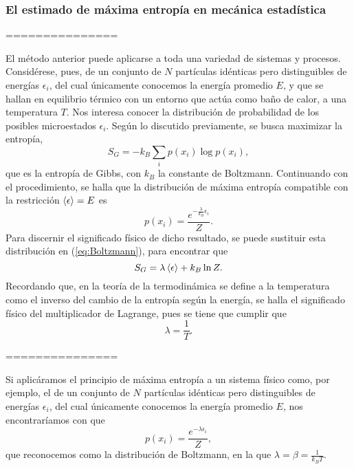 \subsubsection{El estimado de máxima entropía en mecánica estadística}

===============

El método anterior puede aplicarse a toda una variedad de sistemas y procesos. Considérese, pues, de un conjunto de $N$ partículas idénticas pero distinguibles de energías $\epsilon_{i}$, del cual únicamente conocemos la energía promedio $E$, y que se hallan en equilibrio térmico con un entorno que actúa como baño de calor, a una temperatura $T$. Nos interesa conocer la distribución de probabilidad de los posibles microestados $\epsilon_{i}$. Según lo discutido previamente, se busca maximizar la entropía,
\begin{equation}\label{eq:GibbsEntropy}
    S_{G}=-k_{B}\sum_{i}p(x_{i})\log{p(x_{i})},
\end{equation}
que es la entropía de Gibbs, con $k_{B}$ la constante de Boltzmann. Continuando con el procedimiento, se halla que la distribución de máxima entropía compatible con la restricción $\expval{\epsilon}=E$ es
\begin{equation}\label{eq:Boltzmann}
    p(x_{i})=\frac{e^{-\frac{\lambda}{k_{B}}\epsilon_{i}}}{Z}.
\end{equation}
Para discernir el significado físico de dicho resultado, se puede sustituir esta distribución en (\ref{eq:Boltzmann}), para encontrar que
\begin{equation}
    S_{G}=\lambda\expval{\epsilon}+k_{B}\ln{Z}.
\end{equation}
Recordando que, en la teoría de la termodinámica se define a la temperatura como el inverso del cambio de la entropía según la energía, se halla el significado físico del multiplicador de Lagrange, pues se tiene que cumplir que
\begin{equation*}
    \lambda=\frac{1}{T}.
\end{equation*}

===============

Si aplicáramos el principio de máxima entropía a un sistema físico  como, por ejemplo, el de un conjunto de $N$ partículas idénticas pero distinguibles de energías $\epsilon_{i}$, del cual únicamente conocemos la energía promedio $E$, nos encontraríamos con que
\begin{equation}\label{eq:Boltzman}
    p(x_{i})=\frac{e^{-\lambda\epsilon_{i}}}{Z},
\end{equation}
que reconocemos como la distribución de Boltzmann, en la que $\lambda=\beta=\frac{1}{k_{B}T}$. 
